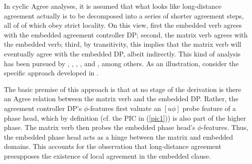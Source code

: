 \documentclass[output=paper
,modfonts
,nonflat]{langsci/langscibook}
\begin{document}
In cyclic Agree analyses, it is assumed that what looks like long-distance
agreement actually is to be decomposed into a series of shorter
agreement steps, all of of which obey strict locality. On this view,
first the embedded verb agrees with the embedded agreement controller
DP; second, the matrix verb agrees with the embedded verb; third, by
transitivity, this implies that the matrix verb will eventually agree
with the embedded DP, albeit indirectly. This kind of analysis has
been pursued by \cite{Butt:95}, \cite{Legate:05:pha}, \cite{Keine:08},
\cite{Preminger:09}, and \cite{Lahne:12}, among others. As an
illustration, consider the specific approach developed in
\cite{Legate:05:pha}.

The basic premise of this approach is that at no stage of the
derivation is there an Agree relation between the matrix verb and the
embedded DP.  Rather, the agreement controller DP's $\phi$-features
first valuate an $[u\phi]$ probe feature of a phase head, which by
definition (cf. the PIC in (\ref{pic1})) is also part of the higher
phase.  The matrix verb then probes the embedded phase head's
$\phi$-features.  Thus, the embedded phase head acts as a hinge
between the matrix and embedded domains.  This accounts for the
observation that long-distance agreement presupposes the existence of
local agreement in the embedded clause. 
\end{document}
